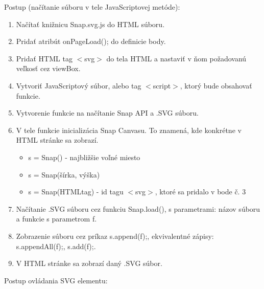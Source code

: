 Postup (načítanie súboru v tele JavaScriptovej metóde): 
\begin{enumerate}
	\item Načítať knižnicu Snap.svg.js do HTML súboru. 
	\item Pridať atribút onPageLoad(); do definicie body.
	\item Pridať HTML tag $<$svg$>$ do tela HTML a nastaviť v ňom požadovanú veľkosť cez viewBox.
	\item Vytvoriť JavaScriptový súbor, alebo tag $<$script$>$, ktorý bude obsahovať funkcie. 
	\item Vytvorenie funkcie na načítanie Snap API a .SVG súboru. 
	\item V tele funkcie inicializácia Snap Canvasu. To znamená, kde konkrétne v HTML stránke sa zobrazí.
	\begin{itemize}
		\item s = Snap() - najbližšie voľné miesto
		\item s = Snap(šírka, výška) 
		\item s = Snap(HTMLtag) - id tagu $<$svg$>$, ktoré sa pridalo v bode č. 3
	\end{itemize}
	\item Načítanie .SVG súboru cez funkciu Snap.load(), s parametrami: názov súboru a funkcie s parametrom f. 
	\item Zobrazenie súboru cez príkaz s.append(f);, ekvivalentné zápisy: s.appendAll(f);, s.add(f);. 
	\item V HTML stránke sa zobrazí daný .SVG súbor. 
	
	
\end{enumerate}

Postup ovládania SVG elementu:

